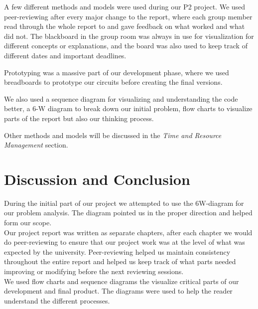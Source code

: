 A few different methods and models were used during our P2 project. We used peer-reviewing after every major change to the report, where each group member read through the whole report to and gave feedback on what worked and what did not. The blackboard in the group room was always in use for visualization for different concepts or explanations, and the board was also used to keep track of different dates and important deadlines.

Prototyping was a massive part of our development phase, where we used breadboards to prototype our circuits before creating the final versions.

We also used a sequence diagram for visualizing and understanding the code better, a 6-W diagram to break down our initial problem, flow charts to visualize parts of the report but also our thinking process.

Other methods and models will be discussed in the \textit{Time and Resource Management} section. 

\section{Discussion and Conclusion}

During the initial part of our project we attempted to use the 6W-diagram for our problem analysis. The diagram pointed us in the proper direction and helped form our scope.
\\
Our project report was written as separate chapters, after each chapter we would do peer-reviewing to ensure that our project work was at the level of what was expected by the university. Peer-reviewing helped us maintain consistency throughout the entire report and helped us keep track of what parts needed improving or modifying before the next reviewing sessions.
\\
We used flow charts and sequence diagrams the visualize critical parts of our development and final product. The diagrams were used to help the reader understand the different processes. 
